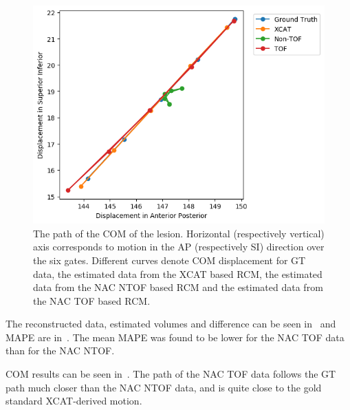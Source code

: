            \begin{figure}
                \centering
                
                \includegraphics[width=1.0\linewidth]{figures/result_1_TOF.png}
                
                \captionsetup{singlelinecheck=false, justification=raggedright}
                \caption{The path of the \gls{COM} of the lesion. Horizontal (respectively vertical) axis corresponds to motion in the \gls{AP} (respectively \gls{SI}) direction over the six gates. Different curves denote \gls{COM} displacement for  \gls{GT} data, the estimated data from the \gls{XCAT} based \gls{RCM}, the estimated data from the \gls{NAC} \gls{NTOF} based \gls{RCM} and the estimated data from the \gls{NAC} \gls{TOF} based \gls{RCM}.} \label{fig:impact_of_tof_on_respiratory_motion_modelling_using_nac_pet_results_com_graph}
            \end{figure}
            
             The reconstructed data, estimated volumes and difference can be seen in~ and \gls{MAPE} are in~. The mean \gls{MAPE} was found to be lower for the \gls{NAC} \gls{TOF} data than for the \gls{NAC} \gls{NTOF}.
            
             \gls{COM} results can be seen in~. The path of the \gls{NAC} \gls{TOF} data follows the \gls{GT} path much closer than the \gls{NAC} \gls{NTOF} data, and is quite close to the gold standard \gls{XCAT}-derived motion.
            
